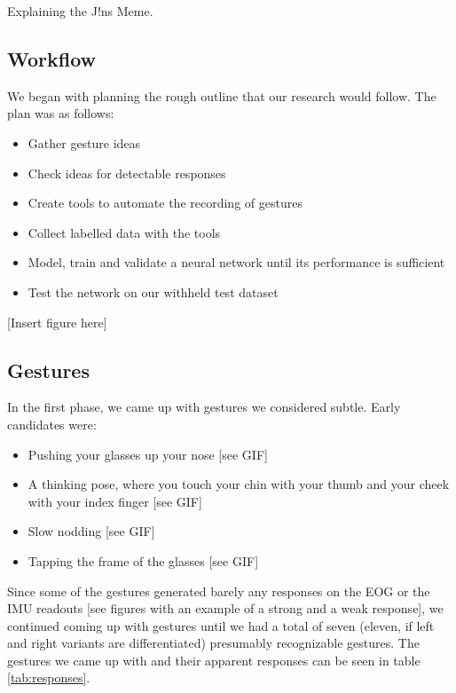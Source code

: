\documentclass[runningheads]{llncs}
\begin{document}
Explaining the J!ns Meme.


\subsection{Workflow}
We began with planning the rough outline that our research would follow.
The plan was as follows:
\begin{itemize}
    \item Gather gesture ideas
    \item Check ideas for detectable responses
    \item Create tools to automate the recording of gestures
    \item Collect labelled data with the tools
    \item Model, train and validate a neural network until its performance is sufficient
    \item Test the network on our withheld test dataset
\end{itemize}

[Insert figure here]

\subsection{Gestures}
In the first phase, we came up with gestures we considered subtle. Early candidates were:
\begin{itemize}
    \item Pushing your glasses up your nose [see GIF]
    \item A thinking pose, where you touch your chin with your thumb and your cheek with your
        index finger [see GIF]
    \item Slow nodding [see GIF]
    \item Tapping the frame of the glasses [see GIF]
\end{itemize}

Since some of the gestures generated barely any responses on the EOG or the IMU readouts
[see figures with an example of a strong and a weak response],
we continued coming up with gestures until we had a total of seven (eleven, if left and
right variants are differentiated) presumably recognizable gestures.
The gestures we came up with and their apparent responses can be seen in table
\ref{tab:responses}.
\end{document}
